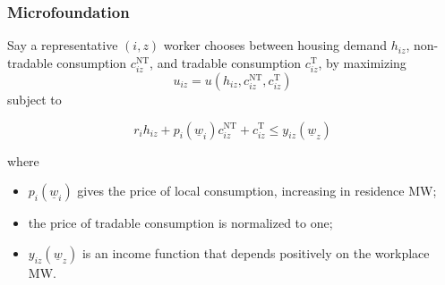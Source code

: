 \documentclass[aspectratio=169, t]{beamer}
\newcommand{\MW}{\underline{w}}
\begin{document}
\begin{frame}[label = microfound]
    \frametitle{Microfoundation}
    Say a representative $(i,z)$ worker chooses between housing demand $h_{iz}$,
    non-tradable consumption $c^{\text{NT}}_{iz}$, and tradable consumption $c^{\text{T}}_{iz}$,
    by maximizing
    \[
    u_{iz} = u \left(h_{iz}, c^{\text{NT}}_{iz}, c^{\text{T}}_{iz}\right)
    \]
    subject to

    \[
    r_i h_{iz} + p_i(\MW_i) c^{\text{NT}}_{iz} + c^{\text{T}}_{iz} \leq y_{iz}(\MW_z)
    \]

    where 
    \begin{itemize}
        \item $p_i(\MW_i)$ gives the price of local consumption, increasing in residence MW;
        \item the price of tradable consumption is normalized to one;  
        \item $y_{iz}(\MW_z)$ is an income function that depends positively on the workplace MW.
    \end{itemize}
\end{frame}
\end{document}
